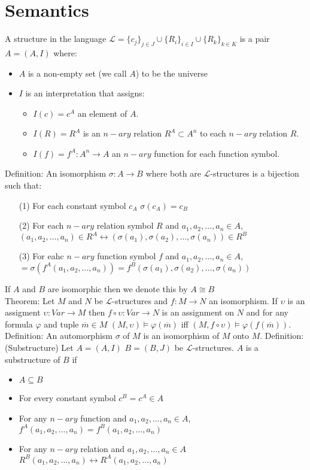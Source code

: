 \documentclass[10pt]{article}
\begin{document}
\section*{Semantics}
A structure in the language $\mathcal{L}=\{c_j\}_{j\in J}\cup\{R_i\}_{i\in I}\cup\{R_k\}_{k\in K}$ is a pair $A=(A,I)$ where:
\begin{itemize}
    \item $A$ is a non-empty set (we call $A$) to be the universe 
    \item $I$ is an interpretation that assigns:
    \begin{itemize}
        \item $I(c)=c^A$ an element of $A$.
        \item $I(R)=R^A$ is an $n-ary$ relation $R^A\subset A^n$ to each $n-ary$ relation $R$.
        \item $I(f)=f^A:A^n\rightarrow A$ an $n-ary$ function for each function symbol.
    \end{itemize}
\end{itemize}
Definition: An isomorphism $\sigma:A\rightarrow B$ where both are $\mathcal{L}$-structures is a bijection such that:
\begin{itemize}
    \item [(1)] For each constant symbol $c_A$ $\sigma(c_A)=c_B$
    \item [(2)] For each $n-ary$ relation symbol $R$ and $a_1,a_2,\ldots,a_n\in A$, $(a_1,a_2,\ldots,a_n)\in R^A\leftrightarrow (\sigma(a_1),\sigma(a_2),\ldots,\sigma(a_n))\in R^B$
    \item [(3)] For eahc $n-ary$ function symbol $f$ and $a_1,a_2,\ldots,a_n\in A$, $=\sigma(f^A(a_1,a_2,\ldots,a_n))=f^B(\sigma(a_1),\sigma(a_2),\ldots,\sigma(a_n))$ 
\end{itemize}
If $A$ and $B$ are isomorphic then we denote this by $A\cong B$\\
Theorem: Let $M$ and $N$ be $\mathcal{L}$-structures and $f:M\rightarrow N$ an isomorphism. 
If $\upsilon$ is an assigment $\upsilon:Var\rightarrow M$ then $f\circ\upsilon:Var\rightarrow N$ is an assignment on $N$ and for any formula $\varphi$ and tuple $\overline{m}\in M$ $(M,\upsilon)\models\varphi(\overline{m})$ iff $(M,f\circ\upsilon)\models\varphi(f(\overline{m}))$.\\
Definition: An automorphism $\sigma$ of $M$ is an isomorphism of $M$ onto $M$.
Definition: (Substructure) Let $A=(A,I)$ $B=(B,J)$ be $\mathcal{L}$-structures. $A$ is a substructure of $B$ if 
\begin{itemize}
    \item $A\subseteq B$
    \item For every constant symbol $c^B=c^A\in A$
    \item For any $n-ary$ function and $a_1,a_2,\ldots,a_n\in A$, $f^A(a_1,a_2,\ldots,a_n)=f^B(a_1,a_2,\ldots,a_n)$
    \item For any $n-ary$ relation and $a_1,a_2,\ldots,a_n\in A$ $R^B(a_1,a_2,\ldots,a_n)\leftrightarrow R^A(a_1,a_2,\ldots,a_n)$
\end{itemize}
\end{document}
